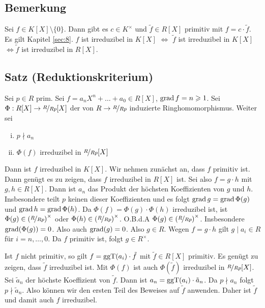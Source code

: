 \subsection[Bemerkung: Erkenntnisse zu primitiven Polynomen aus Kapitel \ref{sec:8}]{Bemerkung} %
\label{sub:92}
Sei $f \in K[X]\setminus \{0\}$. Dann gibt es $c \in K^\times$ und $\tilde f  \in R[X]$ primitiv mit $f = c \cdot \tilde f$. Es gilt Kapitel \ref{sec:8}.
$f$ ist irreduzibel in $K[X]$ $\iff$ $\tilde f $ ist irreduzibel in $K[X]$ $\iff \tilde f$ ist irreduzibel in $R[X]$.

\subsection{Satz (Reduktionskriterium)} %
\label{sub:93}
Sei $p \in R$ prim. Sei $f = a_n X^n + \ldots + a_0 \in R[X]$, $\grad f = n \ge 1$. Sei $\Phi : R[X] \to \nicefrac{R}{Rp}[X]$ der von $R \to \nicefrac{R}{Rp}$ induzierte
Ringhomomorphismus. Weiter sei
\begin{enumerate}[(i)]
	\item $p \nmid a_n$
	\item $\Phi (f) $ irreduzibel in $\nicefrac{R}{Rp}[X]$
\end{enumerate}
Dann ist $f$ irreduzibel in $K[X]$.
Wir nehmen zunächst an, dass $f$ primitiv ist. Dann genügt es zu zeigen, dass $f$ irreduzibel in $R[X]$ ist. Sei also $f=g \cdot h$ mit $g,h \in R[X]$. Dann ist $a_n$ das
Produkt der höchsten Koeffizienten von $g$ und $h$. Insbesondere teilt $p$ keinen dieser Koeffizienten und es folgt $\grad g = \grad \Phi (g)$ und 
$\grad h = \grad \Phi(h)$. Da $\Phi (f)= \Phi (g) \cdot \Phi(h)$ irreduzibel ist, ist $\Phi (g) \in \enbrace*{\nicefrac{R}{Rp}}^\times $ oder 
$\Phi (h) \in \enbrace*{\nicefrac{R}{Rp}}^\times$. O.B.d.A $\Phi (g) \in \enbrace*{\nicefrac{R}{Rp}}^\times $. Insbesondere $\grad (\Phi (g)) =0$. Also auch $\grad (g) =0$.
Also $g \in R$. Wegen $f=g \cdot h$ gilt $g \mid a_i \in R$ für $i=n, \ldots ,0$. Da $f$ primitiv ist, folgt $g \in R^\times$. 

Ist $f$ nicht primitiv, so gilt $f= \ggT(a_i) \cdot \tilde f$ mit $\tilde f \in R[X]$ primitiv. Es genügt zu zeigen, dass $\tilde f$ irreduzibel ist. Mit $\Phi (f)$ ist 
auch $\Phi(\tilde f)$ irreduzibel in $\nicefrac{R}{Rp}[X]$. Sei $\tilde a_n$ der höchste Koeffizient von $\tilde f$. Dann ist $a_n = \ggT(a_i) \cdot \tilde a_n$. Da
$p \nmid a_n$ folgt $p \nmid \tilde a_n$. Also können wir den ersten Teil des Beweises auf $\tilde f$ anwenden. Daher ist $\tilde f$ und damit auch $f$ irreduzibel. 
\bewende


